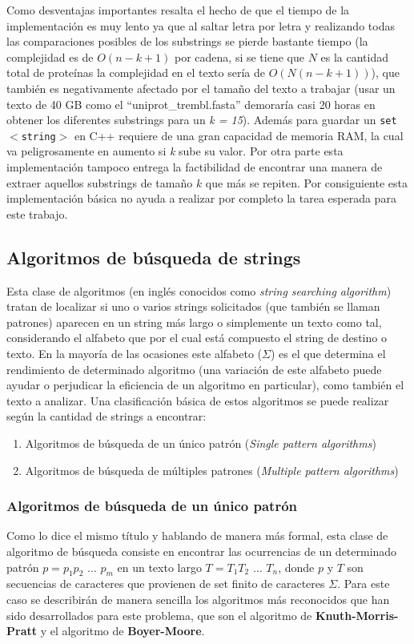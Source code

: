 Como desventajas importantes resalta el hecho de que el tiempo de la implementación es muy lento ya que al saltar letra por letra y realizando todas las comparaciones posibles de los substrings se pierde bastante tiempo (la complejidad es de $O(n-k+1)$ por cadena, si se tiene que $N$ es la cantidad total de proteínas la complejidad en el texto sería de $O(N(n-k+1))$), que también es negativamente afectado por el tamaño del texto a trabajar (usar un texto de 40 GB como el ``uniprot\_trembl.fasta'' demoraría casi 20 horas en obtener los diferentes substrings para un \textit{k = 15}). Además para guardar un \texttt{set$<$string$>$} en C++ requiere de una gran capacidad de memoria RAM, la cual va peligrosamente en aumento si \textit{k} sube su valor. Por otra parte esta implementación tampoco entrega la factibilidad de encontrar una manera de extraer aquellos substrings de tamaño $k$ que más se repiten. Por consiguiente esta implementación básica no ayuda a realizar por completo la tarea esperada para este trabajo. 


\subsection{Algoritmos de búsqueda de strings}

Esta clase de algoritmos (en inglés conocidos como \textit{string searching algorithm}) tratan de localizar si uno o varios strings solicitados (que también se llaman patrones) aparecen en un string más largo o simplemente un texto como tal, considerando el alfabeto que por el cual está compuesto el string de destino o texto. En la mayoría de las ocasiones este alfabeto ($\Sigma$) es el que determina el rendimiento de determinado algoritmo (una variación de este alfabeto puede ayudar o perjudicar la eficiencia de un algoritmo en particular), como también el texto a analizar.
Una clasificación básica de estos algoritmos se puede realizar según la cantidad de strings a encontrar:
\begin{enumerate}
\item Algoritmos de búsqueda de un único patrón (\textit{Single pattern algorithms})
\item Algoritmos de búsqueda de múltiples patrones (\textit{Multiple pattern algorithms})
\end{enumerate}

\subsubsection{Algoritmos de búsqueda de un único patrón}
Como lo dice el mismo título y hablando de manera más formal, esta clase de algoritmo de búsqueda consiste en encontrar las ocurrencias de un determinado patrón \cite{stringmatching} $p=p_{1}p_{2}$ $\ldots$ $p_{m}$ en un texto largo $T=T_{1}T_{2}$ $\ldots$ $T_{n}$, donde $p$ y $T$ son secuencias de caracteres que provienen de set finito de caracteres $\Sigma$.
Para este caso se describirán de manera sencilla los algoritmos más reconocidos que han sido desarrollados para este problema, que son el algoritmo de \textbf{Knuth-Morris-Pratt} y el algoritmo de \textbf{Boyer-Moore}.


